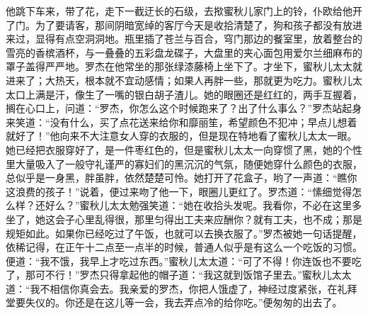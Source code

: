 \par 他跳下车来，带了花，走下一截迂长的石级，去揿蜜秋儿家门上的铃，仆欧给他开了门。为了要请客，那间阴暗宽绰的客厅今天是收拾清楚了，狗和孩子都没有放进来过，显得有点空洞洞地。瓶里插了苍兰与百合，穹门那边的餐室里，放着整台的雪亮的香槟酒杯，与一叠叠的五彩盘龙碟子，大盘里的夹心面包用爱尔兰细麻布的罩子盖得严严地。罗杰在他常坐的那张绿漆藤椅上坐下了。才坐下，蜜秋儿太太就进来了；大热天，根本就不宜动感情；如果人再胖一些，那就更为吃力。蜜秋儿太太口上满是汗，像生了一嘴的银白胡子渣儿。她的眼圈还是红红的，两手互握着，搁在心口上，问道：“罗杰，你怎么这个时候跑来了？出了什么事么？”罗杰站起身来笑道：“没有什么，买了点花送来给你和靡丽笙，希望颜色不犯冲；早点儿想着就好了！”他向来不大注意女人穿的衣服的，但是现在特地看了蜜秋儿太太一眼。她已经把衣服穿好了，是一件枣红色的，但是蜜秋儿太太一向穿惯了黑，她的个性里大量吸入了一般守礼谨严的寡妇们的黑沉沉的气氛，随便她穿什么颜色的衣服，总似乎是一身黑，胖虽胖，依然楚楚可怜。她打开了花盒子，哟了一声道：“瞧你这浪费的孩子！”说着，便过来吻了他一下，眼圈儿更红了。罗杰道：“愫细觉得怎么样？还好么？”蜜秋儿太太勉强笑道：“她在收拾头发呢。我看你，不必在这里多坐了，她这会子心里乱得很，那里匀得出工夫来应酬你？就有工夫，也不成；那是规矩如此。如果你已经吃过了午饭，也就可以去换衣服了。”罗杰被她一句话提醒，依稀记得，在正午十二点至一点半的时候，普通人似乎是有这么一个吃饭的习惯。便道：“我不饿，我早上才吃过东西。”蜜秋儿太太道：“可了不得！你连饭也不要吃了，那可不行！”罗杰只得拿起他的帽子道：“我这就到饭馆子里去。”蜜秋儿太太道：“我不相信你真会去。我亲爱的罗杰，你把人饿虚了，神经过度紧张，在礼拜堂要失仪的。你还是在这儿等一会，我去弄点冷的给你吃。”便匆匆的出去了。
